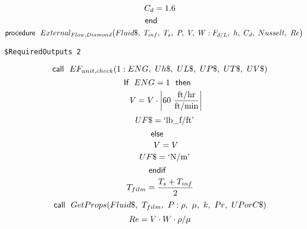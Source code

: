 \documentclass[10pt,fleqn]{article}
\newcommand{\F}[1]{\mbox{$#1$}}
\newcommand{\K}[1]{\mbox{\sf#1\ \ \mit}}
\newcommand{\KS}[1]{\mbox{\sf\ \ #1\ \ \mit}}
\newcommand{\SC}[1]{\mbox{`#1'}\  }
\newcommand{\V}[1]{\mbox{$ #1 $}}
\newcommand{\I}{\mbox{\hspace{0.20in}}}
\begin{document}
\begin{equation}
\I \label{EES Eqn:301}
C_{d}=1.6 
\end{equation}
\begin{equation}
\label{EES Eqn:302}
\K{end} 
\end{equation}
\vspace{0.1 in}
\begin{equation}
\label{EES Eqn:303}
\K{procedure} \F{External_{Flow,Diamond}}{ \left( Fluid\$,\ T_{inf},\ T_{s},\  P,\ V,\ W: F_{d/L},\ h,\ C_{d},\ \V{Nusselt} ,\ \V{Re}  \right) } 
\end{equation}
\begin{verbatim}
$RequiredOutputs 2
\end{verbatim}  \begin{equation}
\I \label{EES Eqn:304}
\K{call} \F{EF_{unit,check}}{ \left( 1:\V{ENG} ,\ Uh\$,\ UL\$,\ UP\$,\ UT\$,\ UV\$ \right) } 
\end{equation}
\begin{equation}
\I \label{EES Eqn:305}
\K{If} \V{ENG} =1 \KS{then} 
\end{equation}
\begin{equation}
\I \I \label{EES Eqn:306}
V=V\cdot \rm { \left|60\ \frac {\rm{ft/hr}}{\rm{ft/min}}\right|} 
\end{equation}
\begin{equation}
\I \I \label{EES Eqn:307}
UF\$=\SC{lb\_f/ft} 
\end{equation}
\begin{equation}
\I \label{EES Eqn:308}
\K{else} 
\end{equation}
\begin{equation}
\I \I \label{EES Eqn:309}
V=V 
\end{equation}
\begin{equation}
\I \I \label{EES Eqn:310}
UF\$=\SC{N/m} 
\end{equation}
\begin{equation}
\I \label{EES Eqn:311}
\K{endif} 
\end{equation}
\begin{equation}
\I \label{EES Eqn:312}
T_{film}=\frac {T_{s}+T_{inf}}{ 2 } 
\end{equation}
\begin{equation}
\I \label{EES Eqn:313}
\K{call} \F{GetProps}{ \left( Fluid\$,\ T_{film},\ P: \rho,\ \mu,\ k,\ \V{Pr} ,\ UPorC\$ \right) } 
\end{equation}
\begin{equation}
\I \label{EES Eqn:314}
\V{Re} =V\cdot W\cdot \rho/\mu 
\end{equation}
\end{document}
